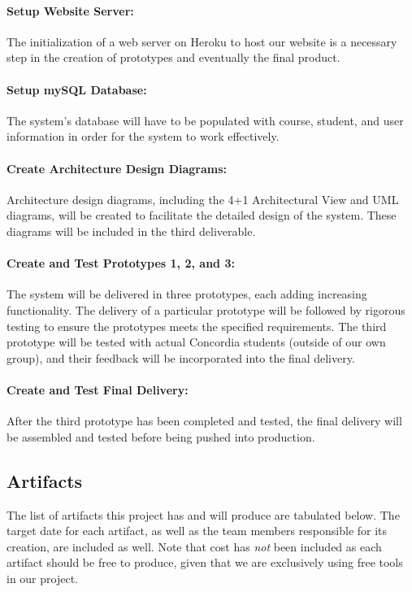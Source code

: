\documentclass[12pt]{article}
\begin{document}
\paragraph*{Setup Website Server:}The initialization of a web server on Heroku to host our website is a necessary step in the creation of prototypes and eventually the final product.

\paragraph*{Setup mySQL Database:}The system's database will have to be populated with course, student, and user information in order for the system to work effectively.

\paragraph*{Create Architecture Design Diagrams:}Architecture design diagrams, including the 4+1 Architectural View and UML diagrams, will be created to facilitate the detailed design of the system. These diagrams will be included in the third deliverable.

\paragraph*{Create and Test Prototypes 1, 2, and 3:}The system will be delivered in three prototypes, each adding increasing functionality. The delivery of a particular prototype will be followed by rigorous testing to ensure the prototypes meets the specified requirements. The third prototype will be tested with actual Concordia students (outside of our own group), and their feedback will be incorporated into the final delivery.

\paragraph*{Create and Test Final Delivery:}After the third prototype has been completed and tested, the final delivery will be assembled and tested before being pushed into production.

\subsection{Artifacts}
The list of artifacts this project has and will produce are tabulated below. The target date for each artifact, as well as the team members responsible for its creation, are included as well. Note that cost has \emph{not} been included as each artifact should be free to produce, given that we are exclusively using free tools in our project.
\end{document}
